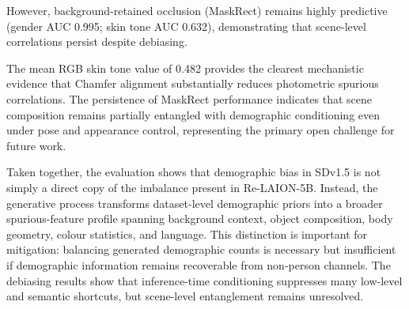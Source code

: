 However, background-retained occlusion (MaskRect) remains highly predictive (gender AUC 0.995; skin tone AUC 0.632), demonstrating that scene-level correlations persist despite debiasing.

The mean RGB skin tone value of 0.482 provides the clearest mechanistic evidence that
Chamfer alignment substantially reduces photometric spurious correlations. The persistence of MaskRect performance indicates that scene composition remains
partially entangled with demographic conditioning even under pose and appearance control,
representing the primary open challenge for future work.

Taken together, the evaluation shows that demographic bias in SDv1.5 is not simply a direct
copy of the imbalance present in Re-LAION-5B. Instead, the generative process transforms
dataset-level demographic priors into a broader spurious-feature profile spanning background
context, object composition, body geometry, colour statistics, and language. This distinction
is important for mitigation: balancing generated demographic counts is necessary but
insufficient if demographic information remains recoverable from non-person channels. The debiasing results show that inference-time conditioning suppresses many low-level and semantic shortcuts, but scene-level entanglement remains unresolved.